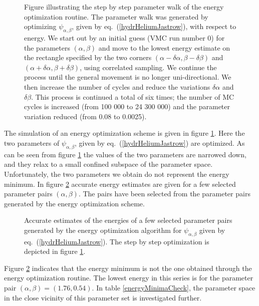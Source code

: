 \begin{figure}[hbtp]
  
  
  \caption{Figure illustrating the step by step parameter walk of the
  energy optimization routine. The parameter walk was generated
  by optimizing $\psi_{\alpha,\beta}$, given by 
  eq.~(\ref{hydrHeliumJastrow}), with respect to energy. We start out
  by an initial guess (VMC run number 0) for the parameters
  $(\alpha,\beta)$ and move to 
  the lowest energy estimate on the rectangle specified by the two
  corners $(\alpha-\delta\alpha,\beta-\delta\beta)$ and
  $(\alpha+\delta\alpha,\beta+\delta\beta)$, using correlated
  sampling. We continue the process 
  until the general movement is no longer uni-directional. We then
  increase the number of cycles and reduce the variations
  $\delta\alpha$ and $\delta\beta$. This process is continued a total
  of six times; the number of MC cycles is increased (from 100 000 to
  24 300 000) and the  parameter variation reduced (from 0.08 to
  0.0025).
  }
  \label{parameterWalkHeHydrfBeta}
\end{figure}

The simulation of an energy optimization scheme is given in figure
\ref{parameterWalkHeHydrfBeta}. Here the two parameters of
$\psi_{\alpha,\beta}$, given by eq.~(\ref{hydrHeliumJastrow}) are
optimized. As can be seen from  
figure \ref{parameterWalkHeHydrfBeta} the values of the two parameters
are narrowed down, and they relax to a small confined subspace  of the
parameter space. Unfortunately, the two parameters we obtain do not
represent the energy minimum. In figure \ref{parameterPairEnergies}
accurate energy estimates are given for a few selected parameter pairs
$(\alpha,\beta)$. The pairs have been selected from the parameter pairs
generated by the energy optimization scheme.
\newline

\begin{figure}[hbtp]
  
  \caption{Accurate estimates of the energies of a few selected
  parameter pairs generated by the energy optimization algorithm for
  $\psi_{\alpha,\beta}$ given by eq.~(\ref{hydrHeliumJastrow}). The
  step by step optimization is depicted in figure
  \ref{parameterWalkHeHydrfBeta}. 
  }
  \label{parameterPairEnergies}
\end{figure}

Figure \ref{parameterPairEnergies} indicates that the energy
minimum is not the one obtained through the energy optimization
routine. The lowest energy in this series is for the parameter pair 
$(\alpha,\beta) = (1.76,0.54)$. In table \ref{energyMinimaCheck}, the
parameter space in the close vicinity of this parameter set is
investigated further.
\newline


